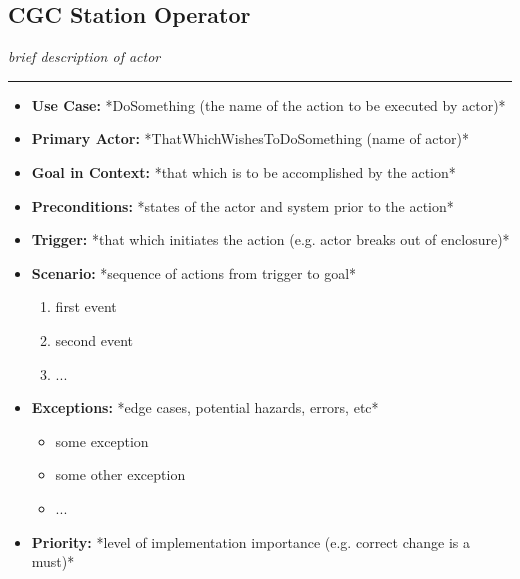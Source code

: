 \documentclass[12pt]{article}
\begin{document}
    \subsection{CGC Station Operator}
    \textit{brief description of actor}
    \par\noindent\rule{\textwidth}{0.4pt}    
    \begin{itemize}
        \item[]\textbf{Use Case:}                                
            *DoSomething (the name of the action to be executed by actor)*

        \item[]\textbf{Primary Actor:}
            *ThatWhichWishesToDoSomething (name of actor)*

        \item[]\textbf{Goal in Context:}
            *that which is to be accomplished by the action*

        \item[]\textbf{Preconditions:}
            *states of the actor and system prior to the action*

        \item[]\textbf{Trigger:}
            *that which initiates the action (e.g. actor breaks out of enclosure)*

        \item[]\textbf{Scenario:}
            *sequence of actions from trigger to goal*
            \begin{enumerate}
                \item first event
                \item second event
                \item ...
            \end{enumerate}

        \item[]\textbf{Exceptions:}
            *edge cases, potential hazards, errors, etc*
            \begin{itemize}
                \item[] some exception
                \item[] some other exception                
                \item[] ...
            \end{itemize}

        \item[]\textbf{Priority:}
            *level of implementation importance (e.g. correct change is a must)*


\end{itemize}
\end{document}
